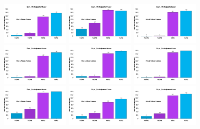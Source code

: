 \begin{figure}[th]
\includegraphics[width=0.30\textwidth]{Figures/MirrorRate_Exp1_P10} \includegraphics[width=0.30\textwidth]{Figures/MirrorRate_Exp1_P11} \includegraphics[width=0.30\textwidth]{Figures/MirrorRate_Exp1_P12}
\includegraphics[width=0.30\textwidth]{Figures/MirrorRate_Exp1_P13} \includegraphics[width=0.30\textwidth]{Figures/MirrorRate_Exp1_P14} \includegraphics[width=0.30\textwidth]{Figures/MirrorRate_Exp1_P15}
\includegraphics[width=0.30\textwidth]{Figures/MirrorRate_Exp1_P16} \includegraphics[width=0.30\textwidth]{Figures/MirrorRate_Exp1_P17} \includegraphics[width=0.30\textwidth]{Figures/MirrorRate_Exp1_P18}

\end{figure}
